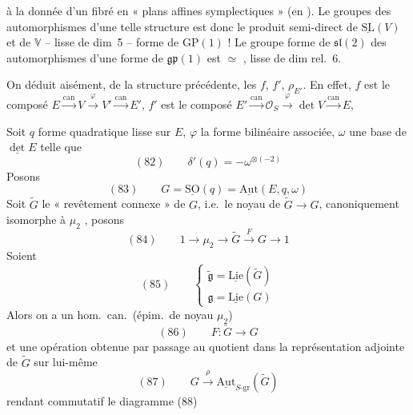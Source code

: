 \documentclass[11pt,a4paper]{article}
\begin{document}
à la donnée d'un fibré en « plans affines symplectiques » (en
). Le  groupes des
automorphismes d'une telle structure est donc le produit semi-direct de
$\underline{\mathrm{SL}}(V)$ et de $\mathbb{V}$ -- lisse de dim~5 -- \ill{}
 \ill{} \ill{} forme de $\mathrm{GP}(1)$ ! Le groupe
 \ill{} forme de $\mathfrak{sl}(2)$  \ill{} des
automorphismes d'une forme de $\mathfrak{gp}(1)$ est $\simeq$ 
 \struck{\ill{}} \ill{}, lisse de dim rel.~6.

On déduit aisément, de la structure précédente, les 
$f$, $f'$, $\rho_{E'}$. En effet, $f$ est le composé
$E \xrightarrow{\mathrm{can}} V \xrightarrow{\varphi} V' \xrightarrow{\mathrm{can}} E'$,
$f'$ est le composé
$E' \xrightarrow{\mathrm{can}} \mathcal{O}_S \xrightarrow{\varphi} \det V \xrightarrow{\mathrm{can}} E$,

Soit $q$ forme quadratique lisse sur $E$, $\varphi$ la forme bilinéaire
associée, $\omega$ une base de $\underline{\det} E$ telle que
\[
  (82) \qquad \delta'(q) = -\omega^{\otimes(-2)}
\]
Posons
\[
  (83) \qquad G = \underline{\mathrm{SO}}(q) = \underline{\mathrm{Aut}}(E, q, \omega)
\]
Soit $\widetilde{G}$ le \struck{\ill{}} « revêtement 
connexe » de $G$,  i.e.\ le noyau de
$\widetilde{G} \to G$, canoniquement isomorphe à $\mu_2$ , posons
\[
  (84) \qquad 1 \to \mu_2 \to \widetilde{G} \xrightarrow{F} G \to 1
\]
Soient
\[
  (85) \qquad
  \begin{cases}
    \widetilde{\mathfrak{g}} = \underline{\mathrm{Lie}}(\widetilde{G}) \\
    \mathfrak{g} = \underline{\mathrm{Lie}}(G)
  \end{cases}
\]
Alors on a un hom.\ can.\ (épim.\ de noyau $\mu_2$)
\[
  (86) \qquad F : \widetilde{G} \to G
\]
et une opération obtenue par passage au quotient dans la représentation
adjointe de $\widetilde{G}$ sur lui-même
\[
  (87) \qquad G \xrightarrow{\ \rho\ } \underline{\mathrm{Aut}}_{S\text{-}\mathrm{gr}}(\widetilde{G})
\]
rendant commutatif le diagramme (88)
\end{document}
